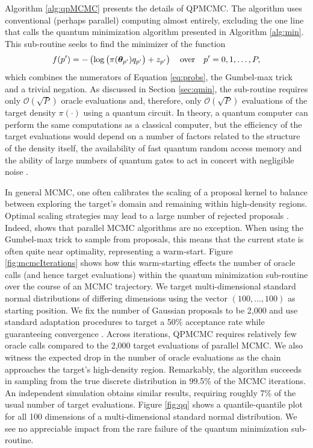 \documentclass[12pt]{article} %
\begin{document}
Algorithm \ref{alg:qpMCMC} presents the details of QPMCMC.  The algorithm uses conventional (perhaps parallel) computing almost entirely, excluding the one line that calls the quantum minimization algorithm presented in Algorithm \ref{alg:min}. This sub-routine seeks to find the minimizer of the function
\begin{align*}
f(p')= -\left(\log \big(\pi(\boldsymbol{\theta}_{p'}) q_{p'}\big) + z_{p'}\right) \quad \mbox{over} \quad p'=0,1,\dots, P,
\end{align*} 
which combines the numerators of Equation \eqref{eq:probs}, the Gumbel-max trick and a trivial negation.  As discussed in Section \ref{sec:qmin}, the sub-routine requires only $\mathcal{O}(\sqrt{P})$ oracle evaluations and, therefore, only $\mathcal{O}(\sqrt{P})$ evaluations of the target density $\pi(\cdot)$ using a quantum circuit.  In theory, a quantum computer can perform the same computations as a classical computer, but the efficiency of the target evaluations would depend on a number of factors related to the structure of the density itself, the availability of fast quantum random access memory \citep{giovannetti2008quantum} and the ability of large numbers of quantum gates to act in concert with negligible noise \citep{kielpinski2002architecture,erhard2019characterizing}.

In general MCMC, one often calibrates the scaling of a proposal kernel to balance between exploring the target's domain and remaining within high-density regions.  Optimal scaling strategies may lead to a large number of rejected proposals \citep{roberts2001optimal}.  Indeed, \citet{holbrook2021generating} shows that parallel MCMC algorithms are no exception. When using the Gumbel-max trick to sample from proposals, this means that the current state is often quite near optimality, representing a warm-start.  Figure \ref{fig:mcmcIterations} shows how this warm-starting effects the number of oracle calls (and hence target evaluations) within the quantum minimization sub-routine over the course of an MCMC trajectory.  We target multi-dimensional standard normal distributions of differing dimensions using the vector $(100,\dots,100)$ as starting position. We fix the number of Gaussian proposals to be 2,000 and use standard adaptation procedures to target a 50\% acceptance rate while guaranteeing convergence \citep{rosenthal2011optimal}. Across iterations, QPMCMC requires relatively few oracle calls compared to the 2,000 target evaluations of parallel MCMC. We also witness the expected drop in the number of oracle evaluations as the chain approaches the target's high-density region. Remarkably, the algorithm succeeds in sampling from the true discrete distribution in 99.5\% of the MCMC iterations. An independent simulation obtains similar results, requiring roughly 7\% of the usual number of target evaluations. Figure \ref{fig:qq} shows a quantile-quantile plot for all 100 dimensions of a multi-dimensional standard normal distribution. We see no appreciable impact from the rare failure of the quantum minimization sub-routine.
\end{document}
